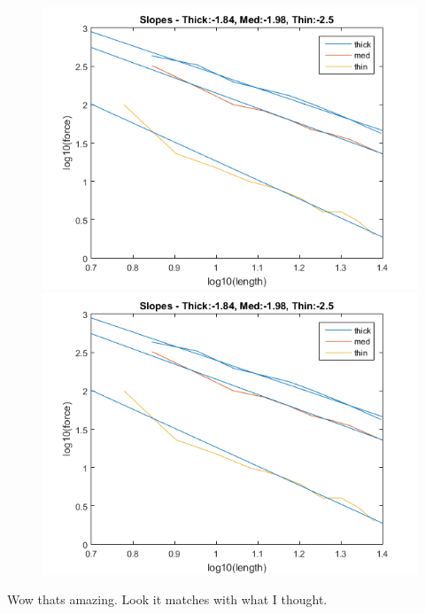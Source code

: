 \documentclass{article}
\begin{document}
\begin{figure}[h]
	\begin{minipage}{.5\textwidth}
		\centering
		\includegraphics[scale=.3]{Lab1f1.png}
	\end{minipage}		
	\begin{minipage}{.5\textwidth}
		\centering
		\includegraphics[scale=.3]{Lab1f1.png}
	\end{minipage}
\end{figure}

Wow thats amazing. Look it matches with what I thought.
\end{document}
